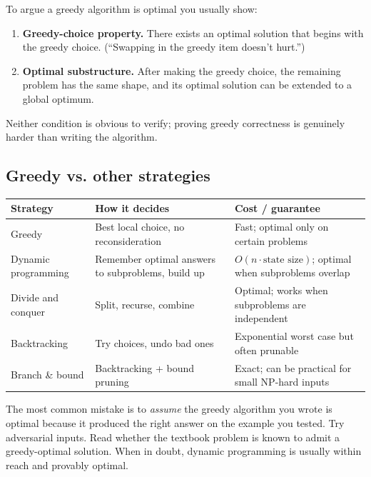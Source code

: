 \documentclass[11pt]{article}
\begin{document}
\begin{ideabox}
To argue a greedy algorithm is optimal you usually show:
\begin{enumerate}[leftmargin=*,noitemsep]
    \item \textbf{Greedy-choice property.} There exists an optimal
          solution that begins with the greedy choice. (``Swapping in
          the greedy item doesn't hurt.'')
    \item \textbf{Optimal substructure.} After making the greedy
          choice, the remaining problem has the same shape, and its
          optimal solution can be extended to a global optimum.
\end{enumerate}
Neither condition is obvious to verify; proving greedy correctness
is genuinely harder than writing the algorithm.
\end{ideabox}

\subsection{Greedy vs. other strategies}

\begin{center}
\small
\begin{tabular}{p{3.4cm} p{4cm} p{4.6cm}}
\textbf{Strategy} & \textbf{How it decides} & \textbf{Cost / guarantee} \\
\hline
Greedy & Best local choice, no reconsideration & Fast; optimal only
on certain problems \\
Dynamic programming & Remember optimal answers to subproblems, build
up & $O(n \cdot \text{state size})$; optimal when subproblems
overlap \\
Divide and conquer & Split, recurse, combine & Optimal; works when
subproblems are independent \\
Backtracking & Try choices, undo bad ones & Exponential worst case
but often prunable \\
Branch \& bound & Backtracking + bound pruning & Exact; can be
practical for small NP-hard inputs \\
\end{tabular}
\normalsize
\end{center}

\begin{warnbox}
The most common mistake is to \emph{assume} the greedy algorithm
you wrote is optimal because it produced the right answer on the
example you tested. Try adversarial inputs. Read whether the
textbook problem is known to admit a greedy-optimal solution. When
in doubt, dynamic programming is usually within reach and
provably optimal.
\end{warnbox}
\end{document}
